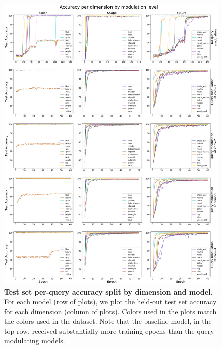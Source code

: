 \begin{figure}[!htb]
\centering
\includegraphics[width=\linewidth]{ch-results/figures/query_mod_simultaneous/query_mod_by_dimension.png}
\caption[Test set per-query accuracy split by dimension and model.]{ {\bf Test set per-query accuracy split by dimension and model.} For each model (row of plots), we plot the held-out test set accuracy for each dimension (column of plots). Colors used in the plots match the colors used in the dataset. Note that the baseline model, in the top row, received substantially more training epochs than the query-modulating models.}
\label{fig:results-query-mod-simultaneous-query-mod-by-dimension}
\end{figure}

